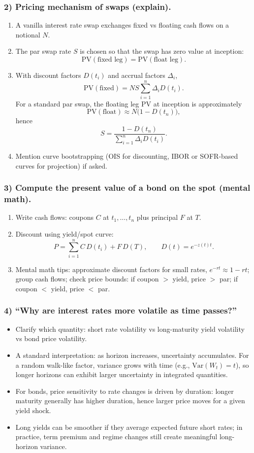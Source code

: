 \documentclass[11pt,letterpaper,openany]{book}
\newcommand{\prompt}[1]{\subsubsection*{#1}}
\begin{document}
\prompt{2) Pricing mechanism of swaps (explain).}
\begin{enumerate}
  \item A vanilla interest rate swap exchanges fixed vs floating cash flows on a notional $N$.
  \item The par swap rate $S$ is chosen so that the swap has zero value at inception:
  \[
    \mathrm{PV}(\text{fixed leg}) = \mathrm{PV}(\text{float leg}).
  \]
  \item With discount factors $D(t_i)$ and accrual factors $\Delta_i$,
  \[
    \mathrm{PV}(\text{fixed}) = NS\sum_{i=1}^n \Delta_i D(t_i).
  \]
  For a standard par swap, the floating leg PV at inception is approximately
  \[
    \mathrm{PV}(\text{float}) \approx N\bigl(1 - D(t_n)\bigr),
  \]
  hence
  \[
    S = \frac{1 - D(t_n)}{\sum_{i=1}^n \Delta_i D(t_i)}.
  \]
  \item Mention curve bootstrapping (OIS for discounting, IBOR or SOFR-based curves for projection) if asked.
\end{enumerate}

\prompt{3) Compute the present value of a bond on the spot (mental math).}
\begin{enumerate}
  \item Write cash flows: coupons $C$ at $t_1, \ldots, t_n$ plus principal $F$ at $T$.
  \item Discount using yield/spot curve:
  \[
    P = \sum_{i=1}^n C\,D(t_i) + F\,D(T),
    \qquad
    D(t) = e^{-z(t)t}.
  \]
  \item Mental math tips: approximate discount factors for small rates, $e^{-rt} \approx 1 - rt$; group cash flows; check price bounds: if coupon $>$ yield, price $>$ par; if coupon $<$ yield, price $<$ par.
\end{enumerate}

\prompt{4) ``Why are interest rates more volatile as time passes?''}
\begin{itemize}
  \item Clarify which quantity: short rate volatility vs long-maturity yield volatility vs bond price volatility.
  \item A standard interpretation: as horizon increases, uncertainty accumulates. For a random walk-like factor, variance grows with time (e.g., $\mathrm{Var}(W_t) = t$), so longer horizons can exhibit larger uncertainty in integrated quantities.
  \item For bonds, price sensitivity to rate changes is driven by duration: longer maturity generally has higher duration, hence larger price moves for a given yield shock.
  \item Long yields can be smoother if they average expected future short rates; in practice, term premium and regime changes still create meaningful long-horizon variance.
\end{itemize}
\end{document}
